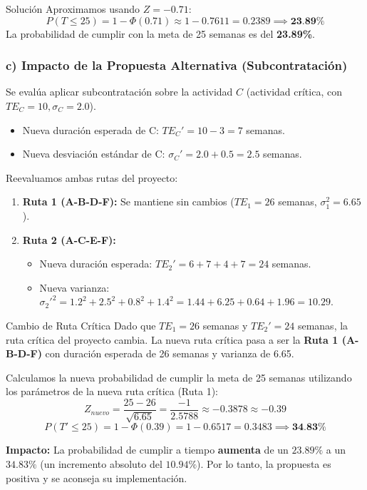 \documentclass[11pt, a4paper]{article}
\begin{document}
\begin{ejercicio}{Solución}
  Aproximamos usando $Z = -0.71$:
  \begin{equation*}
    P(T \le 25) = 1 - \Phi(0.71) \approx 1 - 0.7611 = 0.2389 \implies \textbf{23.89\%}
  \end{equation*}
  La probabilidad de cumplir con la meta de 25 semanas es del \textbf{23.89\%}.

  \subsubsection*{c) Impacto de la Propuesta Alternativa (Subcontratación)}
  Se evalúa aplicar subcontratación sobre la actividad $C$ (actividad crítica, con $TE_C=10, \sigma_C=2.0$).
  \begin{itemize}
    \item Nueva duración esperada de C: $TE_C' = 10 - 3 = 7$ semanas.
    \item Nueva desviación estándar de C: $\sigma_C' = 2.0 + 0.5 = 2.5$ semanas.
  \end{itemize}

  Reevaluamos ambas rutas del proyecto:
  \begin{enumerate}
    \item \textbf{Ruta 1 (A-B-D-F):} Se mantiene sin cambios ($TE_1 = 26$ semanas, $\sigma_1^2 = 6.65$).
    \item \textbf{Ruta 2 (A-C-E-F):}
    \begin{itemize}
      \item Nueva duración esperada: $TE_2' = 6 + 7 + 4 + 7 = 24$ semanas.
      \item Nueva varianza: $\sigma_2'^2 = 1.2^2 + 2.5^2 + 0.8^2 + 1.4^2 = 1.44 + 6.25 + 0.64 + 1.96 = 10.29$.
    \end{itemize}
  \end{enumerate}

  \begin{trampa}{Cambio de Ruta Crítica}
    Dado que $TE_1 = 26$ semanas y $TE_2' = 24$ semanas, la ruta crítica del proyecto cambia. La nueva ruta crítica pasa a ser la \textbf{Ruta 1 (A-B-D-F)} con duración esperada de 26 semanas y varianza de 6.65.
  \end{trampa}

  Calculamos la nueva probabilidad de cumplir la meta de 25 semanas utilizando los parámetros de la nueva ruta crítica (Ruta 1):
  \begin{equation*}
    Z_{nuevo} = \frac{25 - 26}{\sqrt{6.65}} = \frac{-1}{2.5788} \approx -0.3878 \approx -0.39
  \end{equation*}
  \begin{equation*}
    P(T' \le 25) = 1 - \Phi(0.39) = 1 - 0.6517 = 0.3483 \implies \textbf{34.83\%}
  \end{equation*}

  \textbf{Impacto:} La probabilidad de cumplir a tiempo \textbf{aumenta} de un $23.89\%$ a un $34.83\%$ (un incremento absoluto del $10.94\%$). Por lo tanto, la propuesta es positiva y se aconseja su implementación.

\end{ejercicio}
\end{document}
